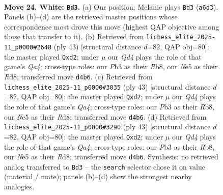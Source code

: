 \documentclass[11pt]{article}
\begin{document}
\begin{figure}[p]
\label{fig:thought-m44}
\end{figure}

\clearpage

\begin{figure}[p]\centering
\begin{subfigure}{0.46\textwidth}\centering
\resizebox{\linewidth}{!}{%
\newchessgame
\chessboard[
  setfen={r2qb1k1/p4ppp/Br3n2/p2pN3/3Q2PP/1P6/P4P2/R3R1K1 w - - 3 24},
  showmover=false,
  pgfstyle=straightmove, color=movearrow, markmove={a6-d3}
]}
\caption{}
\end{subfigure}\hfill
\begin{subfigure}{0.46\textwidth}\centering
\resizebox{\linewidth}{!}{%
\newchessgame
\chessboard[
  setfen={1r1r2k1/pp3pp1/5n2/q6p/P1pP3P/3bP1P1/R2QNPB1/4R1K1 b - - 2 22},
  showmover=false,
  pgfstyle=straightmove, color=movearrow, markmove={a5-d2}
]}
\caption{}
\end{subfigure}
\\[4pt]
\begin{subfigure}{0.46\textwidth}\centering
\resizebox{\linewidth}{!}{%
\newchessgame
\chessboard[
  setfen={1r1r2k1/pp3pp1/5n2/q6p/P1pP3P/3bP1P1/R2QNPB1/4R1K1 b - - 2 22},
  showmover=false,
  pgfstyle=straightmove, color=movearrow, markmove={a5-d2}
]}
\caption{}
\end{subfigure}\hfill
\begin{subfigure}{0.46\textwidth}\centering
\resizebox{\linewidth}{!}{%
\newchessgame
\chessboard[
  setfen={1r1r2k1/pp3pp1/5n2/q6p/P1pP3P/3bP1P1/R2QNPB1/4R1K1 b - - 2 22},
  showmover=false,
  pgfstyle=straightmove, color=movearrow, markmove={a5-d2}
]}
\caption{}
\end{subfigure}
\caption{\textbf{Move 24, White: \texttt{Bd3}.} (a) Our position; Melanie plays \texttt{Bd3} (\texttt{a6d3}). Panels (b)--(d) are the retrieved master positions whose correspondence most drove this move (highest QAP objective among those that transfer to it). (b) Retrieved from \texttt{lichess\_elite\_2025-11\_p0000\#2648} (ply 43) [structural distance $d$=82, QAP obj=80]: the master played \texttt{Qxd2}; under $\mu$ our \emph{Qd4} plays the role of that game's \emph{Qa4}; cross-type roles: our \emph{P}b3 as their \emph{R}b8, our \emph{N}e5 as their \emph{R}d8; transferred move \texttt{d4b6}. (c) Retrieved from \texttt{lichess\_elite\_2025-11\_p0000\#3035} (ply 43) [structural distance $d$=82, QAP obj=80]: the master played \texttt{Qxd2}; under $\mu$ our \emph{Qd4} plays the role of that game's \emph{Qa4}; cross-type roles: our \emph{P}b3 as their \emph{R}b8, our \emph{N}e5 as their \emph{R}d8; transferred move \texttt{d4b6}. (d) Retrieved from \texttt{lichess\_elite\_2025-11\_p0000\#3290} (ply 43) [structural distance $d$=82, QAP obj=80]: the master played \texttt{Qxd2}; under $\mu$ our \emph{Qd4} plays the role of that game's \emph{Qa4}; cross-type roles: our \emph{P}b3 as their \emph{R}b8, our \emph{N}e5 as their \emph{R}d8; transferred move \texttt{d4b6}. Synthesis: no retrieved analog transferred to \texttt{Bd3} -- the \texttt{search} selector chose it on value (material / mate); panels (b)--(d) show the strongest nearby analogies.}
\label{fig:thought-m46}
\end{figure}
\end{document}
